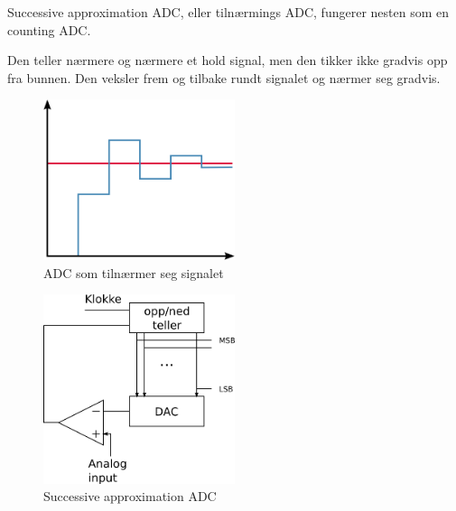 Successive approximation ADC, eller tilnærmings ADC, fungerer nesten som
en counting ADC.

Den teller nærmere og nærmere et hold signal, men den tikker ikke gradvis
opp fra bunnen.
Den veksler frem og tilbake rundt signalet og nærmer seg gradvis.

\begin{figure}[H]
  \centering
  \caption{ADC som tilnærmer seg signalet}
  \includegraphics[width=0.5\textwidth]{./img/oppnedout}
\end{figure}

\begin{figure}[H]
  \centering
  \caption{Successive approximation ADC}
  \includegraphics[width=0.5\textwidth]{./img/oppnedADC}
\end{figure}
